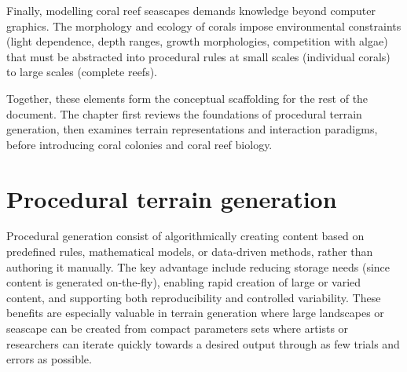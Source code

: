 Finally, modelling coral reef seascapes demands knowledge beyond computer graphics. The morphology and ecology of corals impose environmental constraints (light dependence, depth ranges, growth morphologies, competition with algae) that must be abstracted into procedural rules at small scales (individual corals) to large scales (complete reefs).

Together, these elements form the conceptual scaffolding for the rest of the document. The chapter first reviews the foundations of procedural terrain generation, then examines terrain representations and interaction paradigms, before introducing coral colonies and coral reef biology.




\section{Procedural terrain generation}
\label{sec:state-of-the-art_procedural-generation}

Procedural generation consist of algorithmically creating content based on predefined rules, mathematical models, or data-driven methods, rather than authoring it manually. The key advantage include reducing storage needs (since content is generated on-the-fly), enabling rapid creation of large or varied content, and supporting both reproducibility and controlled variability. These benefits are especially valuable in terrain generation where large landscapes or seascape can be created from compact parameters sets where artists or researchers can iterate quickly towards a desired output through as few trials and errors as possible.

